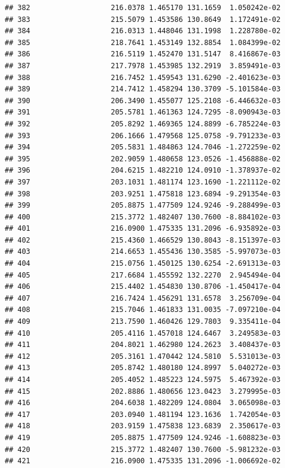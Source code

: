 \documentclass[
]{article}
\begin{document}
\begin{verbatim}
## 382                   216.0378 1.465170 131.1659  1.050242e-02
## 383                   215.5079 1.453586 130.8649  1.172491e-02
## 384                   216.0313 1.448046 131.1998  1.228780e-02
## 385                   218.7641 1.453149 132.8854  1.084399e-02
## 386                   216.5119 1.452470 131.5147  8.416867e-03
## 387                   217.7978 1.453985 132.2919  3.859491e-03
## 388                   216.7452 1.459543 131.6290 -2.401623e-03
## 389                   214.7412 1.458294 130.3709 -5.101584e-03
## 390                   206.3490 1.455077 125.2108 -6.446632e-03
## 391                   205.5781 1.461363 124.7295 -8.090943e-03
## 392                   205.8292 1.469365 124.8899 -6.785224e-03
## 393                   206.1666 1.479568 125.0758 -9.791233e-03
## 394                   205.5831 1.484863 124.7046 -1.272259e-02
## 395                   202.9059 1.480658 123.0526 -1.456888e-02
## 396                   204.6215 1.482210 124.0910 -1.378937e-02
## 397                   203.1031 1.481174 123.1690 -1.221112e-02
## 398                   203.9251 1.475818 123.6894 -9.291354e-03
## 399                   205.8875 1.477509 124.9246 -9.288499e-03
## 400                   215.3772 1.482407 130.7600 -8.884102e-03
## 401                   216.0900 1.475335 131.2096 -6.935892e-03
## 402                   215.4360 1.466529 130.8043 -8.151397e-03
## 403                   214.6653 1.455436 130.3585 -5.997073e-03
## 404                   215.0756 1.450125 130.6254 -2.691313e-03
## 405                   217.6684 1.455592 132.2270  2.945494e-04
## 406                   215.4402 1.454830 130.8706 -1.450417e-04
## 407                   216.7424 1.456291 131.6578  3.256709e-04
## 408                   215.7046 1.461833 131.0035 -7.097210e-04
## 409                   213.7590 1.460426 129.7803  9.335411e-04
## 410                   205.4116 1.457018 124.6467  3.249583e-03
## 411                   204.8021 1.462980 124.2623  3.408437e-03
## 412                   205.3161 1.470442 124.5810  5.531013e-03
## 413                   205.8742 1.480180 124.8997  5.040272e-03
## 414                   205.4052 1.485223 124.5975  5.467392e-03
## 415                   202.8886 1.480656 123.0423  3.279995e-03
## 416                   204.6038 1.482209 124.0804  3.065098e-03
## 417                   203.0940 1.481194 123.1636  1.742054e-03
## 418                   203.9159 1.475838 123.6839  2.350617e-03
## 419                   205.8875 1.477509 124.9246 -1.608823e-03
## 420                   215.3772 1.482407 130.7600 -5.981232e-03
## 421                   216.0900 1.475335 131.2096 -1.006692e-02

\end{verbatim}
\end{document}
